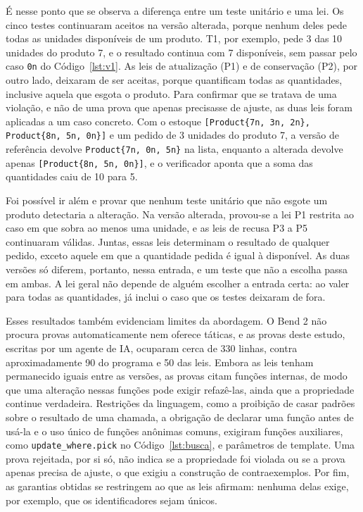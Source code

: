 É nesse ponto que se observa a diferença entre um teste unitário e uma lei. Os cinco testes continuaram aceitos na versão alterada, porque nenhum deles pede todas as unidades disponíveis de um produto. T1, por exemplo, pede 3 das 10 unidades do produto 7, e o resultado continua com 7 disponíveis, sem passar pelo caso \texttt{0n} do Código~\ref{lst:v1}. As leis de atualização (P1) e de conservação (P2), por outro lado, deixaram de ser aceitas, porque quantificam todas as quantidades, inclusive aquela que esgota o produto. Para confirmar que se tratava de uma violação, e não de uma prova que apenas precisasse de ajuste, as duas leis foram aplicadas a um caso concreto. Com o estoque \texttt{[Product\{7n, 3n, 2n\}, Product\{8n, 5n, 0n\}]} e um pedido de 3 unidades do produto 7, a versão de referência devolve \texttt{Product\{7n, 0n, 5n\}} na lista, enquanto a alterada devolve apenas \texttt{[Product\{8n, 5n, 0n\}]}, e o verificador aponta que a soma das quantidades caiu de 10 para 5.

Foi possível ir além e provar que nenhum teste unitário que não esgote um produto detectaria a alteração. Na versão alterada, provou-se a lei P1 restrita ao caso em que sobra ao menos uma unidade, e as leis de recusa P3 a P5 continuaram válidas. Juntas, essas leis determinam o resultado de qualquer pedido, exceto aquele em que a quantidade pedida é igual à disponível. As duas versões só diferem, portanto, nessa entrada, e um teste que não a escolha passa em ambas. A lei geral não depende de alguém escolher a entrada certa: ao valer para todas as quantidades, já inclui o caso que os testes deixaram de fora.

Esses resultados também evidenciam limites da abordagem. O Bend 2 não procura provas automaticamente nem oferece táticas, e as provas deste estudo, escritas por um agente de IA, ocuparam cerca de 330 linhas, contra aproximadamente 90 do programa e 50 das leis. Embora as leis tenham permanecido iguais entre as versões, as provas citam funções internas, de modo que uma alteração nessas funções pode exigir refazê-las, ainda que a propriedade continue verdadeira. Restrições da linguagem, como a proibição de casar padrões sobre o resultado de uma chamada, a obrigação de declarar uma função antes de usá-la e o uso único de funções anônimas comuns, exigiram funções auxiliares, como \texttt{update\_where.pick} no Código~\ref{lst:busca}, e parâmetros de template. Uma prova rejeitada, por si só, não indica se a propriedade foi violada ou se a prova apenas precisa de ajuste, o que exigiu a construção de contraexemplos. Por fim, as garantias obtidas se restringem ao que as leis afirmam: nenhuma delas exige, por exemplo, que os identificadores sejam únicos.

